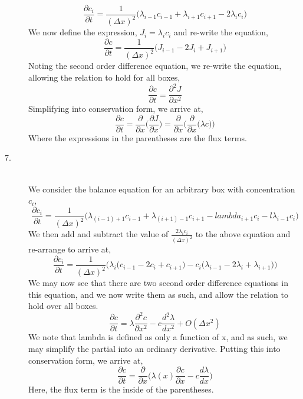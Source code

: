\documentclass[letterpaper,10pt]{article}
\begin{document}
\begin{description}
\[\frac{\partial c_i}{\partial t}=\frac{1}{(\Delta x)^2}\bigg(\lambda_{i-1}c_{i-1}+\lambda_{i+1}c_{i+1}-2\lambda_ic_i\bigg)\]
We now define the expression, $J_i=\lambda_ic_i$ and re-write the equation,
\[\frac{\partial c}{\partial t}=\frac{1}{(\Delta x)^2}\bigg(J_{i-1}-2J_i+J_{i+1}\bigg)\]
Noting the second order difference equation, we re-write the equation, allowing the relation to hold for all boxes,
\[\frac{\partial c}{\partial t}=\frac{\partial^2 J}{\partial x^2}\]
Simplifying into conservation form, we arrive at,
\[\frac{\partial c}{\partial t}=\frac{\partial}{\partial x}\bigg(\frac{\partial J}{\partial x}\bigg)=\frac{\partial}{\partial x}\bigg(\frac{\partial}{\partial x}\big(\lambda c\big)\bigg)\]
Where the expressions in the parentheses are the flux terms.
\item[7.]\hfill\\
We consider the balance equation for an arbitrary box with concentration $c_i$,
\[\frac{\partial c_i}{\partial t}=\frac{1}{(\Delta x)^2}\bigg(\lambda_{(i-1)+1}c_{i-1}+\lambda_{(i+1)-1}c_{i+1}-lambda_{i+1}c_i-l\lambda_{i-1}c_i\bigg)\]
We then add and subtract the value of $\frac{2\lambda_ic_i}{(\Delta x)^2}$ to the above equation and re-arrange to arrive at,
\[\frac{\partial c_i}{\partial t}=\frac{1}{(\Delta x)^2}\bigg(\lambda_{i}\big(c_{i-1}-2c_i+c_{i+1}\big)-c_i\big(\lambda_{i-1}-2\lambda_i+\lambda_{i+1}\big)\bigg)\]
We may now see that there are two second order difference equations in this equation, and we now write them as such, and allow the relation to hold over all boxes.
\[\frac{\partial c}{\partial t}=\lambda\frac{\partial^2 c}{\partial x^2}-c\frac{d^2 \lambda}{dx^2}+O(\Delta x^2)\]
We note that lambda is defined as only a function of x, and as such, we may simplify the partial into an ordinary derivative. Putting this into conservation form, we arrive at,
\[\frac{\partial c}{\partial t}=\frac{\partial}{\partial x}\bigg(\lambda(x)\frac{\partial c}{\partial x}-c\frac{d\lambda}{dx}\bigg)\]
Here, the flux term is the inside of the parentheses.
\end{description}
\end{document}
